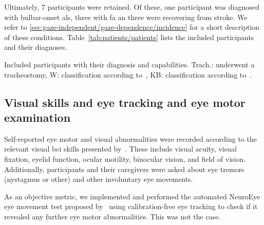Ultimately, 7 participants were retained.
Of these, one participant was diagnosed with bulbar-onset \ac{als}, three with
\ac{fa} an three were recovering from stroke.
We refer to \cref{sec:gaze-independent/gaze-dependence/incidence} for a short
description of these conditions.
Table~\ref{tab:patients/patients} lists the included participants and their
diagnoses.
\begin{table}[t]
  \centering
  \makebox[\textwidth][c]{%
  \footnotesize
  
  }
  \caption[Included participants with their diagnosis and
  capabilities.]{Included participants with their diagnosis and
  capabilities.
  Trach.: underwent a tracheostomy, W: classification according
  to~\textcite{Wolpaw2006}\footnotemark[1], KB: classification according
  to~\textcite{Kuebler2008}\footnotemark[2].
  }
  \label{tab:patients/patients}
\end{table}
\subsection{Visual skills and eye tracking and eye motor examination}




Self-reported eye motor and visual abnormalities were recorded according to the
relevant visual \ac{bci} skills presented by~\textcite{FriedOken2020}.
These include visual acuity, visual fixation, eyelid function, ocular motility,
binocular vision, and field of vision.
Additionally, participants and their caregivers were asked about eye tremors
(nystagmus or other) and other involuntary eye movements.

As an objective metric, we implemented and performed the automated NeuroEye eye movement
test proposed by~\textcite{Hassan2022} using calibration-free eye tracking to
check if it revealed any further eye motor abnormalities.
This was not the case.

\begin{table}[t]
  
  \caption[Visual skills of the included participants.]{%
  Visual skills of the included participants.
  Visual~\ac{bci} skills~\cite{FriedOken2020}
  were assessed with a combination of self-reported issues
  by the subject and the NeuroEye~\cite{Hassan2022} test. \BigCross\
  impaired, \BigDiamondshape\ severely impaired.
  logMAR: lower is better.}
  \label{tab:patients/eye}
\end{table}

